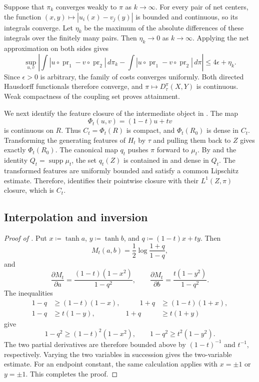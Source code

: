 \documentclass[11pt]{amsart}
\theoremstyle{plain}
\theoremstyle{definition}
\theoremstyle{remark}
\DeclareMathOperator{\pr}{pr}
\DeclareMathOperator{\supp}{supp}
\begin{document}
Suppose that $\pi_k$ converges weakly to $\pi$ as $k\to\infty$. For every pair of net centers, the function $(x,y)\mapsto|u_i(x)-v_j(y)|$ is bounded and continuous, so its integrals converge. Let $\eta_k$ be the maximum of the absolute differences of these integrals over the finitely many pairs. Then $\eta_k\to0$ as $k\to\infty$. Applying the net approximation on both sides gives
\[
\sup_{u,v}\left|
\int|u\circ\pr_1-v\circ\pr_2|\,d\pi_k
-\int|u\circ\pr_1-v\circ\pr_2|\,d\pi
\right|\leq4\epsilon+\eta_k.
\]
Since $\epsilon>0$ is arbitrary, the family of costs converges uniformly. Both directed Hausdorff functionals therefore converge, and $\pi\mapsto D_\tau^\pi(X,Y)$ is continuous. Weak compactness of the coupling set \cite[Lemma~2.10]{gds1} proves attainment.

We next identify the feature closure of the intermediate object in . The map
\[
\Phi_t(u,v)=(1-t)u+tv
\]
is continuous on $R$. Thus $C_t=\Phi_t(R)$ is compact, and $\Phi_t(R_0)$ is dense in $C_t$. Transforming the generating features of $H_t$ by $\tau$ and pulling them back to $Z$ gives exactly $\Phi_t(R_0)$. The canonical map $q_t$ pushes $\pi$ forward to $\mu_t$. By  and the identity $Q_t=\supp\mu_t$, the set $q_t(Z)$ is contained in and dense in $Q_t$. The transformed features are uniformly bounded and satisfy a common Lipschitz estimate. Therefore,  identifies their pointwise closure with their $L^1(Z,\pi)$ closure, which is $C_t$.

\subsection{Interpolation and inversion}
\label{subsec:app-interpolation-inversion}

\begin{proof}[Proof of ]
Put $x\coloneqq\tanh a$, $y\coloneqq\tanh b$, and $q\coloneqq(1-t)x+ty$. Then
\[
M_t(a,b)=\frac12\log\frac{1+q}{1-q},
\]
and
\[
\frac{\partial M_t}{\partial a}
=\frac{(1-t)(1-x^2)}{1-q^2},\qquad
\frac{\partial M_t}{\partial b}
=\frac{t(1-y^2)}{1-q^2}.
\]
The inequalities
\[
\begin{aligned}
1-q&\geq(1-t)(1-x),&\qquad 1+q&\geq(1-t)(1+x),\\
1-q&\geq t(1-y),&1+q&\geq t(1+y)
\end{aligned}
\]
give
\[
1-q^2\geq(1-t)^2(1-x^2),\qquad
1-q^2\geq t^2(1-y^2).
\]
The two partial derivatives are therefore bounded above by $(1-t)^{-1}$ and $t^{-1}$, respectively. Varying the two variables in succession gives the two-variable estimate. For an endpoint constant, the same calculation applies with $x=\pm1$ or $y=\pm1$. This completes the proof.
\end{proof}
\end{document}
